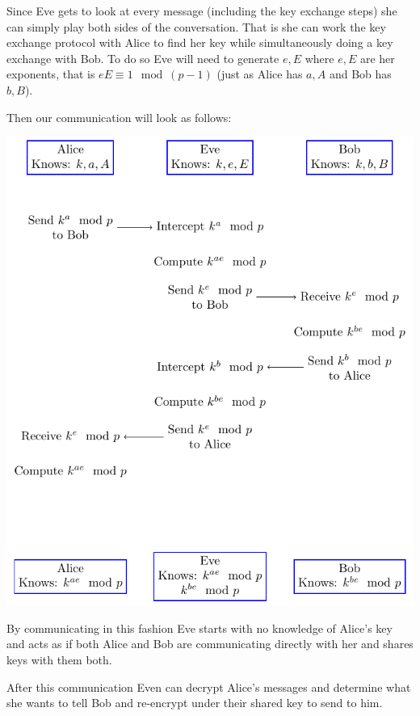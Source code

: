 \documentclass[addpoints]{exam}
\begin{document}
\begin{questions}
\begin{solution}
    Since Eve gets to look at every message (including the key exchange steps)
    she can simply play both sides of the conversation. That is she can work the
    key exchange protocol with Alice to find her key while simultaneously doing
    a key exchange with Bob. To do so Eve will need to generate $e, E$ where
    $e,E$ are her exponents, that is $eE\equiv 1\mod (p-1)$ (just
    as Alice has $a,A$ and Bob has $b,B$).

    Then our communication will look as follows:
    \begin{center}
      \includegraphics{AliceEveBob}
      \label{fig:MITM}
    \end{center}

    By communicating in this fashion Eve starts with no knowledge of Alice's key
    and acts as if both Alice and Bob are communicating directly with her and
    shares keys with them both.     

    After this communication Even can decrypt Alice's messages and determine
    what she wants to tell Bob and re-encrypt under their shared key to send to
    him.
  \end{solution}
\end{questions}
\end{document}
